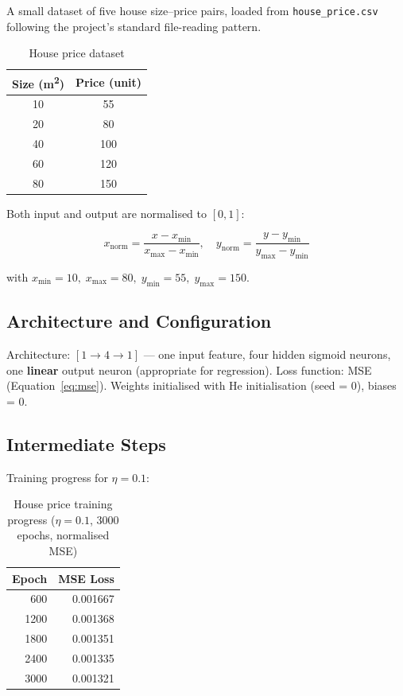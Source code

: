 \documentclass[12pt,a4paper]{article}
\begin{document}
A small dataset of five house size–price pairs, loaded from \texttt{house\_price.csv}
following the project's standard file-reading pattern.

\begin{table}[H]
\centering
\caption{House price dataset}
\begin{tabular}{cc}
\toprule
Size (m\textsuperscript{2}) & Price (unit) \\
\midrule
10 & 55 \\
20 & 80 \\
40 & 100 \\
60 & 120 \\
80 & 150 \\
\bottomrule
\end{tabular}
\end{table}

Both input and output are normalised to $[0, 1]$:

\[
    x_{\mathrm{norm}} = \frac{x - x_{\min}}{x_{\max} - x_{\min}}, \quad
    y_{\mathrm{norm}} = \frac{y - y_{\min}}{y_{\max} - y_{\min}}
\]

with $x_{\min} = 10,\; x_{\max} = 80,\; y_{\min} = 55,\; y_{\max} = 150$.

\subsection{Architecture and Configuration}

Architecture: $[1 \to 4 \to 1]$ --- one input feature, four hidden sigmoid neurons,
one \textbf{linear} output neuron (appropriate for regression).
Loss function: MSE (Equation~\eqref{eq:mse}).
Weights initialised with He initialisation (seed = 0), biases = 0.

\subsection{Intermediate Steps}

Training progress for $\eta = 0.1$:

\begin{table}[H]
\centering
\caption{House price training progress ($\eta=0.1$, 3000 epochs, normalised MSE)}
\begin{tabular}{rr}
\toprule
Epoch & MSE Loss \\
\midrule
600  & 0.001667 \\
1200 & 0.001368 \\
1800 & 0.001351 \\
2400 & 0.001335 \\
3000 & 0.001321 \\
\bottomrule
\end{tabular}
\end{table}
\end{document}
